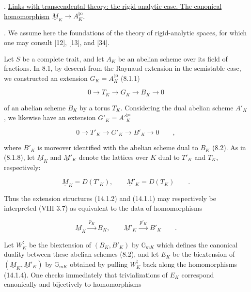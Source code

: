 \medskip
{}. \underline{Links with transcendental theory: the rigid-analytic
case.  The canonical homomorphism}
$\underline M_K\longrightarrow A_K^{\natural\mathrm o}$.

\medskip
{}. We assume here the foundations of the theory of rigid-analytic
spaces, for which one may consult [12], [13], and [34].

Let $S$ be a complete trait, and let $A_K$ be an abelian scheme over its
field of fractions.  In 8.1, by descent from the Raynaud extension in
the semistable case, we constructed an extension
$G_K=A_K^{\natural\mathrm o}$ (8.1.1)

\begin{equation}\tag{14.1.1}
 0\longrightarrow T_K\longrightarrow G_K\longrightarrow B_K
 \longrightarrow0
\end{equation}

\noindent
of an abelian scheme $B_K$ by a torus $T_K$.  Considering the dual
abelian scheme $A'_K$, we likewise have an extension
$G'_K=A'{}^{\natural\mathrm o}_K$

\begin{equation}\tag{14.1.2}
 0\longrightarrow T'_K\longrightarrow G'_K\longrightarrow B'_K
 \longrightarrow0\qquad ,
\end{equation}

\noindent
where $B'_K$ is moreover identified with the abelian scheme dual to
$B_K$ (8.2).  As in (8.1.8), let $\underline M_K$ and
$\underline M'_K$ denote the lattices over $K$ dual to $T'_K$ and
$T_K$, respectively:

\begin{equation}\tag{14.1.3}
 \underline M_K=D(T'_K),\qquad \underline M'_K=D(T_K)\qquad .
\end{equation}

\noindent
Thus the extension structures (14.1.2) and (14.1.1) may respectively be
interpreted (VIII 3.7) as equivalent to the data of homomorphisms

\begin{equation}\tag{14.1.4}
 \underline M_K\xrightarrow{\ p_K\ }B_K,\qquad
 \underline M'_K\xrightarrow{\ p'_K\ }B'_K\qquad .
\end{equation}

Let $W_K^{\natural}$ be the biextension of $(B_K,B'_K)$ by
$\mathbb G_{mK}$ which defines the canonical duality between these
abelian schemes (8.2), and let $E_K$ be the biextension of
$(\underline M_K,\underline M'_K)$ by $\mathbb G_{mK}$ obtained by
pulling $W_K^{\natural}$ back along the homomorphisms (14.1.4).  One
checks immediately that trivializations of $E_K$ correspond
canonically and bijectively to homomorphisms

